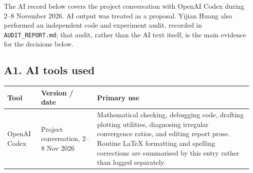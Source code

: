 \documentclass[11pt,a4paper]{article}
\theoremstyle{definition}
\theoremstyle{remark}
\begin{document}
The AI record below covers the project conversation with OpenAI Codex during
2--8 November 2026. AI output was treated as a proposal. Yijian Huang also
performed an independent code and experiment audit, recorded in
\texttt{AUDIT\_REPORT.md}; that audit, rather than the AI text itself, is the
main evidence for the decisions below.

\subsection*{A1. AI tools used}
\begin{table}[H]
\centering
\small
\begin{tabular}{@{}p{3.2cm}p{4.4cm}p{6.4cm}@{}}
\toprule
\textbf{Tool} & \textbf{Version / date} & \textbf{Primary use} \\
\midrule
OpenAI Codex & Project conversation, 2--8 Nov 2026 &
Mathematical checking, debugging code, drafting plotting utilities, diagnosing
irregular convergence ratios, and editing report prose. Routine LaTeX
formatting and spelling corrections are summarised by this entry rather than
logged separately. \\
\bottomrule
\end{tabular}
\end{table}
\end{document}

